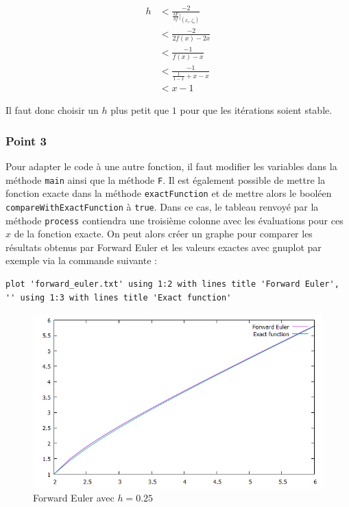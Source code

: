 \begin{equation}
	\begin{aligned}
		h &< \frac{-2}{\frac{\delta F}{\delta f}|_{(x_i, \zeta_i)}}\\
		&< \frac{-2}{2f(x)-2x}\\
		&< \frac{-1}{f(x)-x}\\
		&< \frac{-1}{\frac{1}{1-x}+x-x}\\
		&< x-1
	\end{aligned}
\end{equation}

Il faut donc choisir un $h$ plus petit que $1$ pour que les itérations soient stable.

\subsubsection{Point 3}


Pour adapter le code à une autre fonction, il faut modifier les variables dans la méthode \texttt{main} ainsi que la méthode \texttt{F}. Il est également possible de mettre la fonction exacte dans la méthode \texttt{exactFunction} et de mettre alors le booléen \texttt{compareWithExactFunction} à \texttt{true}. Dans ce cas, le tableau renvoyé par la méthode \texttt{process} contiendra une troisième colonne avec les évaluations pour ces $x$ de la fonction exacte. On peut alors créer un graphe pour comparer les résultats obtenus par Forward Euler et les valeurs exactes avec gnuplot par exemple via la commande suivante :

\begin{lstlisting}
plot 'forward_euler.txt' using 1:2 with lines title 'Forward Euler', '' using 1:3 with lines title 'Exact function'
\end{lstlisting}

\begin{figure}[H]
	\caption{\label{12_forward_1} Forward Euler avec $h=0.25$}
	\centering
	\includegraphics[scale = 0.6]{Figures/12_forward_1.png}
\end{figure}



